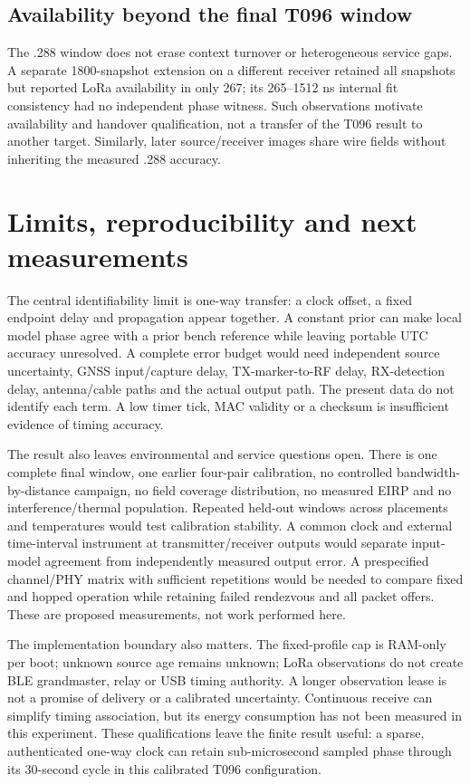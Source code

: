 \documentclass[10pt,letterpaper]{article}
\begin{document}
\subsection{Availability beyond the final T096 window}
The .288 window does not erase context turnover or heterogeneous service gaps.
A separate 1800-snapshot extension on a different receiver retained all snapshots
but reported LoRa availability in only 267; its 265--1512 ns internal fit
consistency had no independent phase witness. Such observations motivate
availability and handover qualification, not a transfer of the T096 result
to another target. Similarly, later source/receiver images share wire fields
without inheriting the measured .288 accuracy.
\clearpage

\section{Limits, reproducibility and next measurements}
The central identifiability limit is one-way transfer: a clock offset, a fixed
endpoint delay and propagation appear together. A constant prior can make
local model phase agree with a prior bench reference while leaving portable
UTC accuracy unresolved. A complete error budget would need independent
source uncertainty, GNSS input/capture delay, TX-marker-to-RF delay,
RX-detection delay, antenna/cable paths and the actual output path. The
present data do not identify each term. A low timer tick, MAC validity or a
checksum is insufficient evidence of timing accuracy.

The result also leaves environmental and service questions open. There is one
complete final window, one earlier four-pair calibration, no controlled
bandwidth-by-distance campaign, no field coverage distribution, no measured
EIRP and no interference/thermal population. Repeated held-out windows across
placements and temperatures would test calibration stability. A common clock
and external time-interval instrument at transmitter/receiver outputs would
separate input-model agreement from independently measured output error.
A prespecified channel/PHY matrix with sufficient repetitions would be needed
to compare fixed and hopped operation while retaining failed rendezvous and
all packet offers. These are proposed measurements, not work performed here.

The implementation boundary also matters. The fixed-profile cap is RAM-only
per boot; unknown source age remains unknown; LoRa observations do not create
BLE grandmaster, relay or USB timing authority. A longer observation lease is
not a promise of delivery or a calibrated uncertainty. Continuous receive can
simplify timing association, but its energy consumption has not been measured
in this experiment. These qualifications leave the finite result useful:
a sparse, authenticated one-way clock can retain sub-microsecond sampled
phase through its 30-second cycle in this calibrated T096 configuration.
\end{document}

